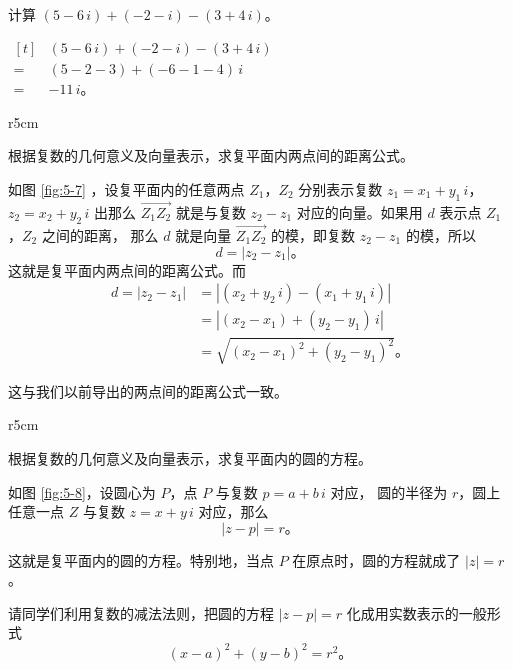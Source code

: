 \liti 计算 $(5-6\,i) + (-2-i) - (3+4\,i)$。

\jie \quad $\begin{aligned}[t]
       & (5-6\,i) + (-2-i) - (3+4\,i) \\[-1em]
    ={}& (5 - 2 - 3) + (-6 - 1 - 4)\,i \\[-1em]
    ={}& -11\,i \text{。}
\end{aligned}$



\begin{minipage}{\textwidth} %
\begin{wrapfigure}[22]{r}{5cm}
    \centering
    
    \caption{}\label{fig:5-7}
\end{wrapfigure}
\liti 根据复数的几何意义及向量表示，求复平面内两点间的距离公式。

\jie 如图 \ref{fig:5-7} ，设复平面内的任意两点 $Z_1$，$Z_2$ 分别表示复数
$z_1 = x_1 + y_1\,i$，$z_2 = x_2 + y_2\,i$ 出那么 $\overrightarrow{Z_1Z_2}$ 就是与复数 $z_2 - z_1$
对应的向量。如果用 $d$ 表示点 $Z_1$，$Z_2$ 之间的距离， 那么 $d$ 就是向量
$\overrightarrow{Z_1Z_2}$ 的模，即复数 $z_2 - z_1$ 的模，所以
$$ d = |z_2 - z_1| \text{。} $$
这就是复平面内两点间的距离公式。而
\begin{align*}
    d = |z_2 - z_1| &= |(x_2 + y_2\,i) - (x_1 + y_1\,i)| \\
        &= |(x_2 - x_1) + (y_2 - y_1)\,i| \\
        &= \sqrt{(x_2 - x_1)^2 + (y_2 - y_1)^2} \text{。}
\end{align*}

这与我们以前导出的两点间的距离公式一致。
\end{minipage}


\begin{wrapfigure}[22]{r}{5cm}
    \centering
    
    \caption{}\label{fig:5-8}
\end{wrapfigure}
\liti 根据复数的几何意义及向量表示，求复平面内的圆的方程。

\jie 如图 \ref{fig:5-8}，设圆心为 $P$，点 $P$ 与复数 $p = a + b\,i$ 对应，
圆的半径为 $r$，圆上任意一点 $Z$ 与复数 $z = x + y\,i$ 对应，那么
$$ |z - p| = r \text{。} $$

这就是复平面内的圆的方程。特别地，当点 $P$ 在原点时，圆的方程就成了 $|z| = r$。

请同学们利用复数的减法法则，把圆的方程 $|z - p| = r$ 化成用实数表示的一般形式
$$ (x - a)^2 + (y - b)^2 = r^2 \text{。} $$


